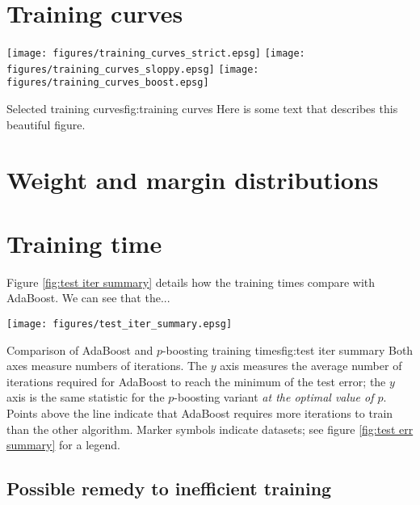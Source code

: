 \section{Training curves}

\begin{linefigure}
\begin{center}
\texttt{[image: figures/training\_curves\_strict.epsg]}
\texttt{[image: figures/training\_curves\_sloppy.epsg]}
\texttt{[image: figures/training\_curves\_boost.epsg]}
\end{center}
\begin{capt}{Selected training curves}{fig:training curves} 
Here is some text that describes this beautiful figure.
\end{capt}
\end{linefigure}

\section{Weight and margin distributions}


\section{Training time}

Figure \ref{fig:test iter summary} details how the training times
compare with AdaBoost.  We can see that the...

\begin{linefigure}
\begin{center}
\texttt{[image: figures/test\_iter\_summary.epsg]}
\end{center}
\begin{capt}{Comparison of AdaBoost and $p$-boosting training
times}{fig:test iter summary} 
Both axes measure numbers of iterations.  The $y$ axis measures the
average number of iterations required for AdaBoost to reach the
minimum of the test error; the $y$ axis is the same statistic for the
$p$-boosting variant \emph{at the optimal value of $p$}.  Points above
the line indicate that AdaBoost requires more iterations to train than
the other algorithm.  Marker symbols indicate datasets; see figure
\ref{fig:test err summary} for a legend.
\end{capt}
\end{linefigure}

\subsection{Possible remedy to inefficient training}

